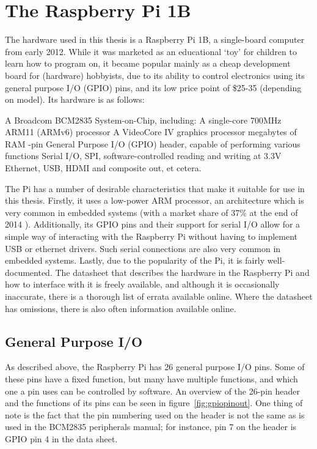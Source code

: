 \documentclass[twoside]{uva-inf-bachelor-thesis}
\begin{document}
\section{The Raspberry Pi 1B}
The hardware used in this thesis is a Raspberry Pi 1B, a single-board computer from early 2012. While it was marketed as an educational `toy' for children to learn how to program on, it became popular mainly as a cheap development board for (hardware) hobbyists, due to its ability to control electronics using its general purpose I/O (GPIO) pins, and its low price point of \$25-35 (depending on model). Its hardware is as follows:

\begin{outline}
    \1 A Broadcom BCM2835 System-on-Chip, including:
        \2 A single-core 700MHz ARM11 (ARMv6) processor
        \2 A VideoCore IV graphics processor
         megabytes of RAM
    -pin General Purpose I/O (GPIO) header, capable of performing various functions
        \2 Serial I/O, SPI, software-controlled reading and writing at 3.3V
    \1 Ethernet, USB, HDMI and composite out, et cetera.
\end{outline}

The Pi has a number of desirable characteristics that make it suitable for use in this thesis. Firstly, it uses a low-power ARM processor, an architecture which is very common in embedded systems (with a market share of 37\% at the end of 2014 \cite{arm:embeddedmarketshare}). Additionally, its GPIO pins and their support for serial I/O allow for a simple way of interacting with the Raspberry Pi without having to implement USB or ethernet drivers. Such serial connections are also very common in embedded systems. Lastly, due to the popularity of the Pi, it is fairly well-documented. The datasheet that describes the hardware in the Raspberry Pi and how to interface with it is freely available\cite{bcm:2835peripherals}, and although it is occasionally inaccurate, there is a thorough list of errata available online\cite{bcm:2835errata}. Where the datasheet has omissions, there is also often information available online.

\subsection{General Purpose I/O}
As described above, the Raspberry Pi has 26 general purpose I/O pins. Some of these pins have a fixed function, but many have multiple functions, and which one a pin uses can be controlled by software. An overview of the 26-pin header and the functions of its pins can be seen in figure~\ref{fig:gpiopinout}. One thing of note is the fact that the pin numbering used on the header is not the same as is used in the BCM2835 peripherals manual; for instance, pin 7 on the header is GPIO pin 4 in the data sheet.
\end{document}
